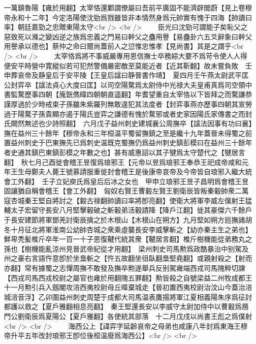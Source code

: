 一萬鎮魯陽【雍於用翻】太宰恪還鄴謂僚屬曰吾前平廣固不能濟辟閭蔚【見上卷穆帝永和十二年】今定洛陽使沈勁爲戮雖皆非本情然身爲元帥實有愧于四海【帥讀曰率】朝廷嘉勁之忠贈東陽太守<br />
<br />
　　臣光曰沈勁可謂能子矣恥父之惡致死以滌之變凶逆之族爲忠義之門易曰幹父之蠱用譽【易蠱卦六五爻辭象曰幹父用譽承以德也】蔡仲之命曰爾尚蓋前人之愆惟忠惟孝【見尚書】其是之謂乎<br />
<br />
　　太宰恪爲將不事威嚴專用恩信撫士卒務綜大要不爲苛令使人人得便安平時營中寛縱似若可犯然警備嚴密敵至莫能近者【近其靳翻】故未嘗負敗　壬申葬哀帝及静皇后于安平陵【王皇后諡曰静晉書作靖】　夏四月壬午燕太尉武平匡公封弈卒【諡法貞心大度曰匡】以司空陽騖爲太尉侍中光禄大夫皇甫真爲司空領中書監騖歷事四朝【廆皝儁暐四朝朝直遥翻】年耆望重自太宰恪以下皆拜之而騖謙恭謹厚過於少時戒束子孫雖朱紫羅列無敢違犯其法度者【封弈事燕亦歷事四朝其宣勞過于陽騖子孫貴顯亦遏于陽氏豈弈之謙德有愧於騖邪或者史家因陽氏家傳書之而封氏闕然無述也少詩照翻】　六月戊子益州刺史建城襄公周撫卒【諡法因事有功曰襄】撫在益州三十餘年【穆帝永和三年桓温平蜀留撫鎮之至是纔十九年蓋晉未得蜀之前置益州刺史于巴東撫先已爲刺史温既克蜀撫仍爲益州刺史鎮彭模曰在益州三十餘年者史通其鎮巴東鎮彭模之年數之也】甚有威惠詔以其子犍爲太守楚代之【犍居言翻】　秋七月己酉徙會稽王昱復爲琅邪王【元帝以昱爲琅邪王奉恭王祀成帝咸和元年王生母鄭夫人薨王號慕請服重徙封會稽王是後康帝哀帝及今帝皆自琅邪入繼大統會工外翻】　壬子立妃庾氏爲皇后后冰之女也　甲申立琅邪王昱子昌明爲會稽王昱固讓猶自稱會稽王【會工外翻】　匈奴右賢王曹轂左賢王劉衛辰皆叛秦轂帥衆二萬寇杏城秦王堅自將討之【轂古禄翻帥讀曰率將卽亮翻】使衛大將軍李威左僕射王猛輔太子宏留守長安八月堅擊轂破之斬轂弟活轂請降【降戶江翻】徙其豪傑六千餘戶于長安建節將軍鄧羌討衛辰擒之於木根山【木根山在朔方】九月堅如朔方廵撫諸胡冬十月征北將軍淮南公幼帥杏城之衆乘虛襲長安李威擊斬之【幼亦秦主生之弟也】　鮮卑秃髪椎斤卒年一百一十子思復鞬代統其衆【鞬居言翻】椎斤樹機能從弟務丸之孫也【樹機能亂涼州見晉武帝紀從才用翻】　梁州刺史司馬勲爲政酷暴治中别駕及州之豪右言語忤意卽於坐梟斬之【忤五故翻坐徂臥翻梟堅堯翻】或親射殺之【射而亦翻】常有據蜀之志憚周撫不敢發及撫卒勲遂舉兵反别駕雍端西戎司馬隗粹切諫【西戎司馬西戎校尉之屬官也雍於用翻隗五罪翻】勲皆殺之自號梁益二州牧成都王十一月勲引兵入劔閣攻涪西夷校尉母丘暐棄城走【晉初置西夷校尉治汶山今蓋治涪城涪音浮】乙卯圍益州刺史周楚于成都大司馬温表鷹揚將軍江夏相義陽朱序爲征討都護以救之【夏戶雅翻相息亮翻】　秦王堅還長安以李威守太尉加侍中以曹轂爲鴈門公劉衛辰爲夏陽公【夏戶雅翻】各使統其部落　十二月戊戌以尚書王彪之爲僕射<br />
<br />
　　海西公上【諱弈字延齡哀帝之母弟也咸康八年封爲東海王穆帝升平五年改封琅邪王卽位後桓温廢爲海西公】<br />
<br />
